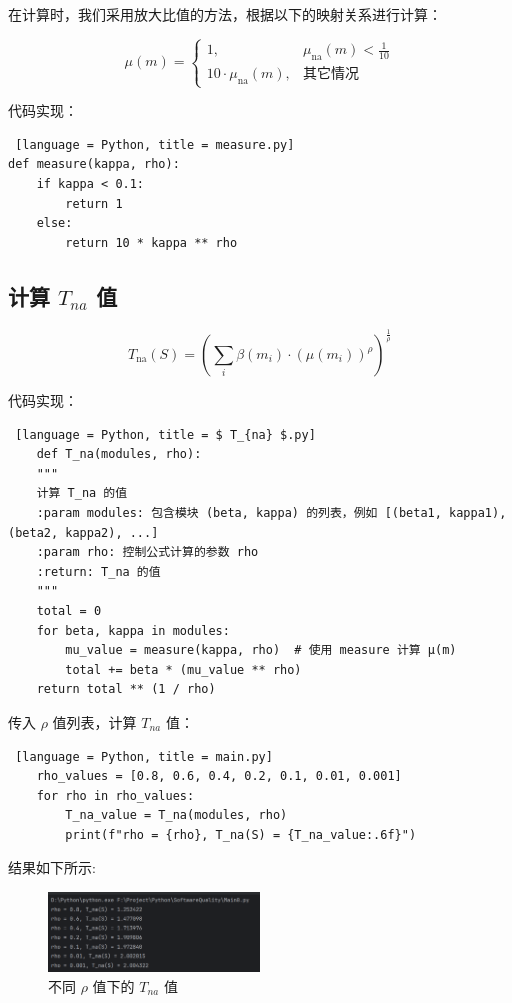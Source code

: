 \documentclass[14pt,a4paper,UTF8,twoside]{article}
\begin{document}
在计算时，我们采用放大比值的方法，根据以下的映射关系进行计算：

\[
\mu(m) = 
\begin{cases} 
1, & \mu_{\text{na}}(m) < \frac{1}{10} \\
10 \cdot \mu_{\text{na}}(m), & \text{其它情况}
\end{cases}
\]

代码实现：

\begin{lstlisting} [language = Python, title = measure.py]
def measure(kappa, rho):
    if kappa < 0.1:
        return 1
    else:
        return 10 * kappa ** rho
\end{lstlisting}

\subsection{计算 \texorpdfstring{$ T_{na} $}{ T_{na} } 值}

\[
    T_{\text{na}}(S) = \left( \sum_{i} \beta(m_i) \cdot (\mu(m_i))^{\rho} \right)^{\frac{1}{\rho}}
\]

代码实现：

\begin{lstlisting} [language = Python, title = $ T_{na} $.py]
    def T_na(modules, rho):
    """
    计算 T_na 的值
    :param modules: 包含模块 (beta, kappa) 的列表，例如 [(beta1, kappa1), (beta2, kappa2), ...]
    :param rho: 控制公式计算的参数 rho
    :return: T_na 的值
    """
    total = 0
    for beta, kappa in modules:
        mu_value = measure(kappa, rho)  # 使用 measure 计算 μ(m)
        total += beta * (mu_value ** rho)
    return total ** (1 / rho)
\end{lstlisting}

传入 $ \rho $ 值列表，计算 $ T_{na} $  值：

\begin{lstlisting} [language = Python, title = main.py]
    rho_values = [0.8, 0.6, 0.4, 0.2, 0.1, 0.01, 0.001]
    for rho in rho_values:
        T_na_value = T_na(modules, rho)
        print(f"rho = {rho}, T_na(S) = {T_na_value:.6f}")
\end{lstlisting}

结果如下所示:

\begin{figure}[H]
    \centering
    \includegraphics[width=0.5\textwidth]{img8/Tna.png}
    \caption{不同 $\rho$ 值下的 $T_{na}$ 值}
\end{figure}
\end{document}
